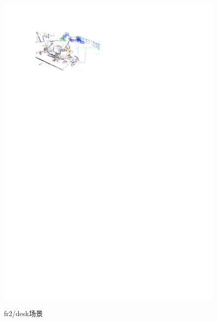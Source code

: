 \begin{figure}[h]
{          \includegraphics[scale=0.7]{figures/Fig4-4_a.pdf}
          }
     \caption{fr2/desk场景}
\label{fig4.4}
\end{figure}



